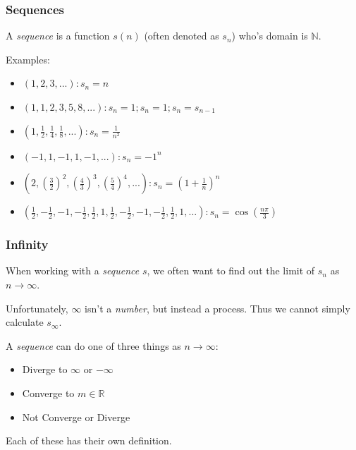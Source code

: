 \documentclass[10pt]{beamer}
\def\R{\mathbb{R}}                     %
\def\N{\mathbb{N}}                     %
\begin{document}
\begin{frame}
  \frametitle{Sequences}

  A \textit{sequence} is a function $s(n)$ (often denoted as $s_n$) who's domain is $\N$.

  Examples:

  \begin{itemize}
  \item $\left ( 1, 2, 3, ... \right ): s_n = n$
  \item $\left ( 1, 1, 2, 3, 5, 8, ... \right ): s_n = 1; s_n = 1; s_n = s_{n-1}$
  \item $\left ( 1, \frac{1}{2}, \frac{1}{4}, \frac{1}{8}, ... \right ): s_n = \frac{1}{n^2}$
  \item $\left ( -1, 1, -1, 1, -1, ... \right ): s_n = -1^n$
  \item $\left ( 2, \left ( \frac{3}{2} \right )^2, \left ( \frac{4}{3} \right )^3, \left ( \frac{5}{4} \right )^4, ... \right ): s_n = \left ( 1 + \frac{1}{n} \right )^n$
  \item $\left ( \frac{1}{2}, -\frac{1}{2}, -1, -\frac{1}{2}, \frac{1}{2}, 1, \frac{1}{2},
    -\frac{1}{2}, -1, -\frac{1}{2}, \frac{1}{2}, 1, ... \right ): s_n = \cos \left ( \frac{n \pi}{3} \right )$
  \end{itemize}

\end{frame}

\begin{frame}
  \frametitle{Infinity}

  When working with a \textit{sequence} $s$, we often want to find out the limit of $s_n$ as $n \to \infty$.
  \vspace{5mm}

  Unfortunately, $\infty$ isn't a \textit{number}, but instead a process. Thus we cannot simply calculate $s_{\infty}$.
  \vspace{5mm}

  A \textit{sequence} can do one of three things as $n \to \infty$:

  \begin{itemize}
  \item Diverge to $\infty$ or $-\infty$
  \item Converge to $m \in \R$
  \item Not Converge or Diverge
  \end{itemize}

  Each of these has their own definition.
  \vspace{5mm}


\end{frame}
\end{document}
